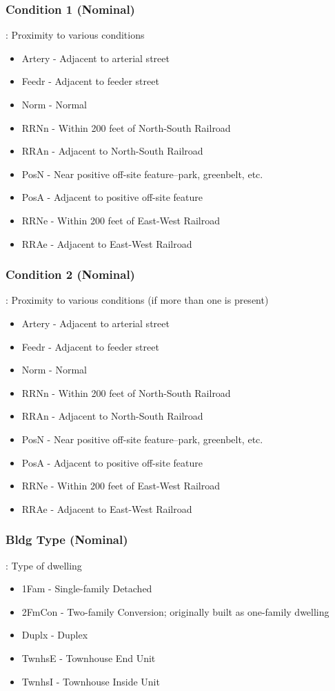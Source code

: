 \documentclass[sigconf]{acmart}
\begin{document}
	\subsubsection{Condition 1 (Nominal)}: Proximity to various conditions
	\begin{itemize}
		\item  Artery - Adjacent to arterial street
		\item  Feedr - Adjacent to feeder street
		\item  Norm - Normal
		\item  RRNn - Within 200 feet of North-South Railroad
		\item  RRAn - Adjacent to North-South Railroad
		\item  PosN - Near positive off-site feature--park, greenbelt, etc.
		\item  PosA - Adjacent to positive off-site feature
		\item  RRNe - Within 200 feet of East-West Railroad
		\item  RRAe - Adjacent to East-West Railroad
	\end{itemize}
	\subsubsection{Condition 2 (Nominal)}: Proximity to various conditions (if more than one is present)
	\begin{itemize}
		\item  Artery - Adjacent to arterial street
		\item  Feedr - Adjacent to feeder street
		\item  Norm - Normal
		\item  RRNn - Within 200 feet of North-South Railroad
		\item  RRAn - Adjacent to North-South Railroad
		\item  PosN - Near positive off-site feature--park, greenbelt, etc.
		\item  PosA - Adjacent to positive off-site feature
		\item  RRNe - Within 200 feet of East-West Railroad
		\item  RRAe - Adjacent to East-West Railroad
	\end{itemize}

	\subsubsection{Bldg Type (Nominal)}: Type of dwelling
	\begin{itemize}
		\item  1Fam - Single-family Detached
		\item  2FmCon - Two-family Conversion; originally built as one-family dwelling
		\item  Duplx - Duplex
		\item  TwnhsE - Townhouse End Unit
		\item  TwnhsI - Townhouse Inside Unit
	\end{itemize}
\end{document}
